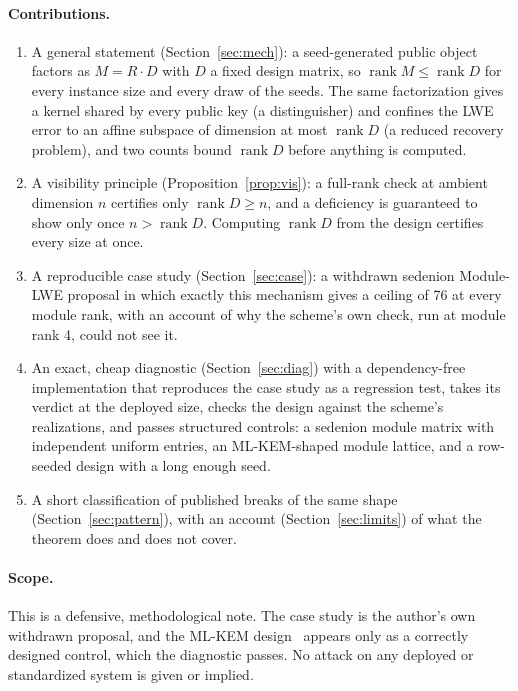 \documentclass[11pt]{article}
\makeatletter
\theoremstyle{remark}
\DeclareMathOperator{\rank}{rank}
\DeclareRobustCommand{\_}{%
  \edef\@tempa{\ttdefault}%
  \ifx\f@family\@tempa\char95 \else\textunderscore\fi\penalty300\relax}
\makeatother
\begin{document}
\paragraph{Contributions.}
\begin{enumerate}
\item A general statement (Section~\ref{sec:mech}): a seed-generated public object factors as $M=R\cdot D$ with $D$ a
  fixed design matrix, so $\rank M\le\rank D$ for every instance size and every draw of the seeds. The same
  factorization gives a kernel shared by every public key (a distinguisher) and confines the LWE error to an affine
  subspace of dimension at most $\rank D$ (a reduced recovery problem), and two counts bound $\rank D$ before anything
  is computed.
\item A visibility principle (Proposition~\ref{prop:vis}): a full-rank check at ambient dimension $n$ certifies only
  $\rank D\ge n$, and a deficiency is guaranteed to show only once $n>\rank D$. Computing $\rank D$ from the design
  certifies every size at once.
\item A reproducible case study (Section~\ref{sec:case}): a withdrawn sedenion Module-LWE proposal in which exactly this
  mechanism gives a ceiling of 76 at every module rank, with an account of why the scheme's own check, run at module
  rank 4, could not see it.
\item An exact, cheap diagnostic (Section~\ref{sec:diag}) with a dependency-free implementation that reproduces the case
  study as a regression test, takes its verdict at the deployed size, checks the design against the scheme's
  realizations, and passes structured controls: a sedenion module matrix with independent uniform entries, an
  ML-KEM-shaped module lattice, and a row-seeded design with a long enough seed.
\item A short classification of published breaks of the same shape (Section~\ref{sec:pattern}), with an account
  (Section~\ref{sec:limits}) of what the theorem does and does not cover.
\end{enumerate}

\paragraph{Scope.} This is a defensive, methodological note. The case study is the author's own withdrawn proposal, and
the ML-KEM design~\cite{FIPS} appears only as a correctly designed control, which the diagnostic passes. No attack on
any deployed or standardized system is given or implied.
\end{document}
